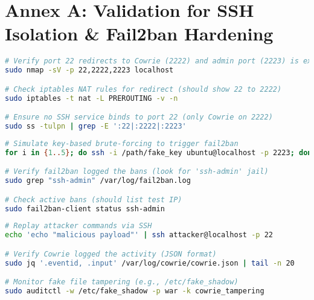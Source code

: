 \newpage

\section*{Annex A: Validation for SSH Isolation \& Fail2ban Hardening}  
\label{annexa}  

\begin{lstlisting}[language=bash, label={annexa:network}, caption={Network Isolation Verification}]  
# Verify port 22 redirects to Cowrie (2222) and admin port (2223) is exclusive  
sudo nmap -sV -p 22,2222,2223 localhost  

# Check iptables NAT rules for redirect (should show 22 to 2222)  
sudo iptables -t nat -L PREROUTING -v -n  

# Ensure no SSH service binds to port 22 (only Cowrie on 2222)  
sudo ss -tulpn | grep -E ':22|:2222|:2223'  
\end{lstlisting}  

\begin{lstlisting}[language=bash, label={annexa:fail2ban}, caption={Fail2ban Efficacy Testing}]  
# Simulate key-based brute-forcing to trigger fail2ban  
for i in {1..5}; do ssh -i /path/fake_key ubuntu@localhost -p 2223; done  

# Verify fail2ban logged the bans (look for 'ssh-admin' jail)  
sudo grep "ssh-admin" /var/log/fail2ban.log  

# Check active bans (should list test IP)  
sudo fail2ban-client status ssh-admin  
\end{lstlisting}  

\begin{lstlisting}[language=bash, label={annexa:cowrie}, caption={Cowrie Logging Validation}]  
# Replay attacker commands via SSH  
echo 'echo "malicious payload"' | ssh attacker@localhost -p 22  

# Verify Cowrie logged the activity (JSON format)  
sudo jq '.eventid, .input' /var/log/cowrie/cowrie.json | tail -n 20  

# Monitor fake file tampering (e.g., /etc/fake_shadow)  
sudo auditctl -w /etc/fake_shadow -p war -k cowrie_tampering  
\end{lstlisting}  



\newpage

